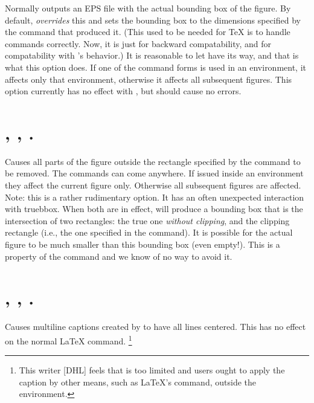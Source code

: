 \documentclass[letterpaper]{article}
\begin{document}
Normally \MP{} outputs an EPS file with the actual bounding box of the
figure. By default, \mfp{} \emph{overrides} this and sets the bounding
box to the dimensions specified by the  command that produced
it. (This used to be needed for \TeX{} is to handle  commands
correctly. Now, it is just for backward compatability, and for
compatability with \MF{}'s behavior.) It is reasonable to let \MP{} have
its way, and that is what this option does. If one of the command forms
is used in an  environment, it affects only that environment,
otherwise it affects all subsequent figures. This option currently has
no effect with \MF{}, but should cause no errors.


\section{, , .}\label{clip}
%
%

Causes all parts of the figure outside the rectangle specified by the
 command to be removed. The commands can come anywhere. If
issued inside an  environment they affect the current figure
only. Otherwise all subsequent figures are affected. Note: this is a
rather rudimentary option. It has an often unexpected interaction with
truebbox. When both are in effect, \MP{} will produce a bounding box
that is the intersection of two rectangles: the true one \emph{without
clipping}, and the clipping rectangle (i.e., the one specified in the
 command). It is possible for the actual figure to be much
smaller than this bounding box (even empty!). This is a property of the
\MP{}  command and we know of no way to avoid it.


\section{, ,
.}\label{centeredcaptions}
%
%

Causes multiline captions created by  to have all lines
centered. This has no effect on the normal \LaTeX{} 
command.%
    \footnote{This writer [DHL] feels that  is too limited
    and users ought to apply the caption by other means, such as
    \LaTeX{}'s  command, outside the 
    environment.}%
\end{document}

